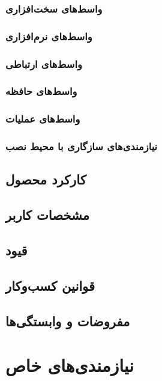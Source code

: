 \documentclass{report}
\begin{document}
				\subsubsection{واسط‌های سخت‌افزاری}
				\subsubsection{واسط‌های نرم‌افزاری} 
				\subsubsection{واسط‌های ارتباطی}
				\subsubsection{واسط‌های حافظه}
				\subsubsection{واسط‌های عملیات}
				\subsubsection{نیازمندی‌های سازگاری با محیط نصب}
			\subsection{کارکرد محصول}
			\subsection{مشخصات کاربر}
			\subsection{قیود}
			\subsection{قوانین کسب‌و‌کار}
			\subsection{مفروضات و وابستگی‌ها}
		\section{نیازمندی‌های خاص}
\end{document}
